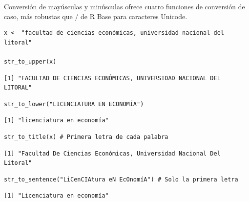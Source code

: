 \documentclass[8pt]{beamer}
\begin{document}
\begin{frame}[fragile]{Conversión de mayúsculas y minúsculas}
	 ofrece cuatro funciones de conversión de caso, más robustas que / de R Base para caracteres Unicode.
\begin{lstlisting}[style=RScript]
x <- "facultad de ciencias económicas, universidad nacional del litoral"

str_to_upper(x)
\end{lstlisting}
\begin{lstlisting}[style=RConsole]
[1] "FACULTAD DE CIENCIAS ECONÓMICAS, UNIVERSIDAD NACIONAL DEL LITORAL"
\end{lstlisting}
\begin{lstlisting}[style=RScript]
str_to_lower("LICENCIATURA EN ECONOMÍA")
\end{lstlisting}
\begin{lstlisting}[style=RConsole]
[1] "licenciatura en economía"
\end{lstlisting}
\begin{lstlisting}[style=RScript]
str_to_title(x) # Primera letra de cada palabra
\end{lstlisting}
\begin{lstlisting}[style=RConsole]
[1] "Facultad De Ciencias Económicas, Universidad Nacional Del Litoral"
\end{lstlisting}
\begin{lstlisting}[style=RScript]
str_to_sentence("LiCenCIAtura eN EcOnomíA") # Solo la primera letra
\end{lstlisting}
\begin{lstlisting}[style=RConsole]
[1] "Licenciatura en economía"
\end{lstlisting}
\end{frame}
\end{document}
